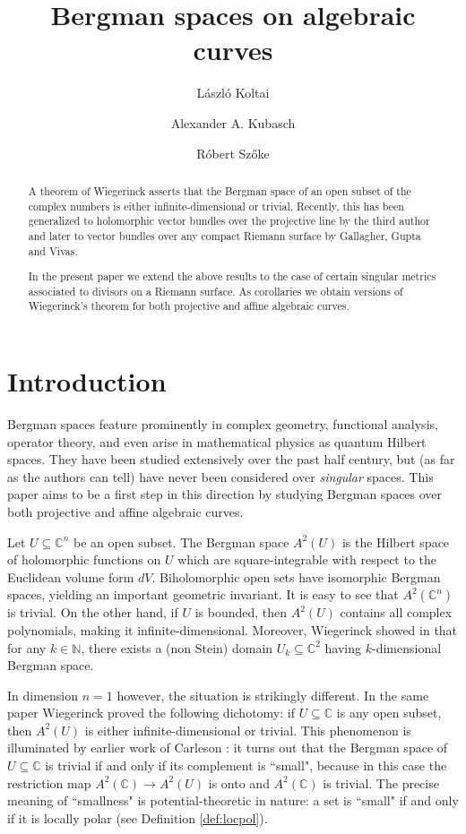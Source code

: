 \documentclass[11pt]{amsart}
\title{Bergman spaces on algebraic curves}
\author{László Koltai}
\author{Alexander A. Kubasch}
\author{Róbert Szőke}
\theoremstyle{definition}
\newcommand{\bC}{{\mathbb C}}
\begin{document}
\begin{abstract}
    A theorem of Wiegerinck asserts that the Bergman space of an open subset of the complex numbers is either infinite-dimensional or trivial. Recently, this has been generalized to holomorphic vector bundles over the projective line by the third author and later to vector bundles over any compact Riemann surface by Gallagher, Gupta and Vivas.
    
    In the present paper we extend the above results to the case of certain singular metrics associated to divisors on a Riemann surface. As corollaries we obtain versions of Wiegerinck's theorem for both projective and affine algebraic curves.
\end{abstract}
\maketitle
    

\section{Introduction}

\noindent Bergman spaces feature prominently in complex geometry, functional analysis, operator theory, and even arise in mathematical physics as quantum Hilbert spaces. They have been studied extensively over the past half century, but (as far as the authors can tell) have never been considered over \emph{singular} spaces. This paper aims to be a first step in this direction by studying Bergman spaces over both projective and affine algebraic curves.\vspace{3mm} 

\noindent Let $U\subseteq \bC^n$ be an open subset. The   Bergman space $A^2(U)$ is the Hilbert space of holomorphic functions on $U$ which are square-integrable with respect to the Euclidean volume form $dV$. Biholomorphic open sets have isomorphic Bergman spaces, yielding an important geometric invariant. It is easy to see that $A^2(\bC^n)$ is trivial.  On the other hand, if $U$ is bounded, then $A^2(U)$ contains all complex polynomials, making it infinite-dimensional. Moreover, Wiegerinck showed in \cite{Wiegerinck} that for any $k \in \mathbb{N}$, there exists a (non Stein) domain $U_k \subseteq \bC^2$ having $k$-dimensional Bergman space.

In dimension $n=1$ however, the situation is strikingly different. In the same paper Wiegerinck proved the following dichotomy: if $U \subseteq \bC$ is any open subset, then $A^2(U)$ is either infinite-dimensional or trivial. This phenomenon is illuminated by earlier work of Carleson \cite{Ca83}: it turns out that the Bergman space of $U \subseteq \bC$ is trivial if and only if its complement is ``small", because in this case the restriction map $A^2(\bC) \to A^2(U)$ is onto and $A^2(\bC)$ is trivial. The precise meaning of ``smallness" is potential-theoretic in nature: a set is ``small" if and only if it is locally polar (see Definition \ref{def:locpol}).
\end{document}
